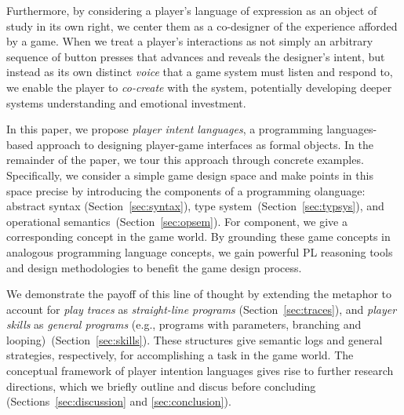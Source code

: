 \documentclass[sigconf]{acmart}
\begin{document}

%
%


Furthermore, by considering a player's language of expression as an object
of study in its own right, we center them as a co-designer of the experience
afforded by a game. When we treat a player's interactions as not simply an
arbitrary sequence of button presses that advances and reveals the
designer's intent, but instead as its own distinct {\em voice} that a game
system must listen and respond to, we enable the player to {\em co-create}
with the system, potentially developing deeper systems understanding
and emotional investment.

In this paper, we propose \emph{player intent languages}, a
programming languages-based approach to designing player-game
interfaces as formal objects.
%
In the remainder of the paper, we tour this approach through concrete
examples.
%
Specifically, we consider a simple game design space and make points
in this space precise by introducing the components of a programming
olanguage:
%
abstract syntax (Section~\ref{sec:syntax}),
%
type system~(Section~\ref{sec:typsys}), 
%
and operational semantics~(Section~\ref{sec:opsem}).
%
For component, we give a corresponding concept in the game world.
%
By grounding these game concepts in analogous programming language
concepts, we gain powerful PL reasoning tools and design methodologies
to benefit the game design process.

We demonstrate the payoff of this line of thought by extending the
metaphor to account for \emph{play traces} as \emph{straight-line
  programs} (Section~\ref{sec:traces}), and {\em player skills} as
\emph{general programs} (e.g., programs with parameters, branching and
looping)~(Section~\ref{sec:skills}).
%
These structures give semantic logs and general strategies,
respectively, for accomplishing a task in the game world.
%
The conceptual framework of player intention languages gives rise to
further research directions, which we briefly outline and discus
before concluding (Sections~\ref{sec:discussion} and \ref{sec:conclusion}).
\end{document}
